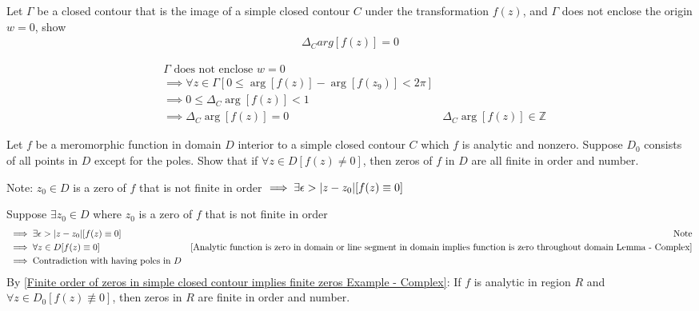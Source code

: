 \documentclass[12pt, english]{book}
\makeatletter
\renewenvironment{proof}[1][\proofname]{\par
	\pushQED{\qed}%
	\normalfont \topsep6\p@\@plus6\p@\relax
	\list{}{%
		\settowidth{\leftmargin}{\itshape\proofname:\hskip\labelsep}%
		\setlength{\labelwidth}{0pt}%
		\setlength{\itemindent}{-\leftmargin}%
		}%
	\item[\hskip\labelsep\itshape#1\@addpunct{:}]\ignorespaces
	}{\popQED\endlist\@endpefalse}
\makeatother
\begin{document}
	\begin{example}
		\label{Closed contour does not enclose origin implies winding number is zero Example - Complex}
		Let \(\Gamma\) be a closed contour that is the image of a simple closed contour \(C\) under the transformation \(f(z)\), and \(\Gamma\) does not enclose the origin \(w = 0\), show 
		\begin{align*}
			\Delta_{C} arg[f(z)] = 0
		\end{align*}
		\begin{proof}
			{\color{Grey}
			\begin{align*}
				&\Gamma \text{ does not enclose } w=0 \\
				&\implies \forall z \in \Gamma [0 \leq \arg[f(z)] - \arg[f(z_9)] < 2\pi] \\
				&\implies 0 \leq \Delta_{C} \arg[f(z)] < 1 \\
				&\implies \Delta_{C} \arg[f(z)] = 0
					&\Delta_{C} \arg[f(z)] \in \mathbb{Z}
			\end{align*}
			}
		\end{proof}
	\end{example}
	
	\begin{example}
		\label{Function not identically zero in domain implies zeros of function finite in order and number Example - Complex}
		Let \(f\) be a meromorphic function in domain \(D\) interior to a simple closed contour \(C\) which \(f\) is analytic and nonzero. Suppose \(D_0\) consists of all points in \(D\) except for the poles. Show that if \(\forall z \in D[f(z) \neq 0]\), then zeros of \(f\) in \(D\) are all finite in order and number.
		
		Note: \(z_0 \in D\) is a zero of \(f\) that is not finite in order \(\implies \exists \epsilon > \abs{z-z_0} [f(z) \equiv 0]\)
		\begin{proof}
			{\color{Grey}
			Suppose \(\exists z_0 \in D\) where \(z_0\) is a zero of \(f\) that is not finite in order
			\begin{align*}
				&\implies \exists \epsilon > \abs{z-z_0} [f(z) \equiv 0]
					&\text{Note} \\
				&\implies \forall z \in D [f(z) \equiv 0] 
					&\text{\Cref{Analytic function is zero in domain or line segment in domain implies function is zero throughout domain Lemma - Complex}} \\
				&\implies \text{Contradiction with having poles in } D
			\end{align*}
			By \cref{Finite order of zeros in simple closed contour implies finite zeros Example - Complex}:
			If \(f\) is analytic in region \(R\) and \(\forall z \in D_0 [f(z) \nequiv 0]\), then zeros in \(R\) are finite in order and number.
			}
		\end{proof}
	\end{example}
	
\end{document}
